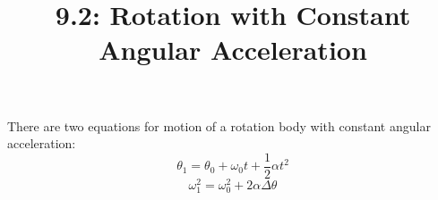 \documentclass{article}
\title{9.2: Rotation with Constant Angular Acceleration}
\begin{document}
\maketitle
There are two equations for motion of a rotation body with constant angular acceleration: $$\theta_1 = \theta_0 + \omega_0t + \frac{1}{2}\alpha t^2$$ $$\omega_1^2 = \omega_0^2 + 2\alpha \Delta\theta$$
\end{document}
